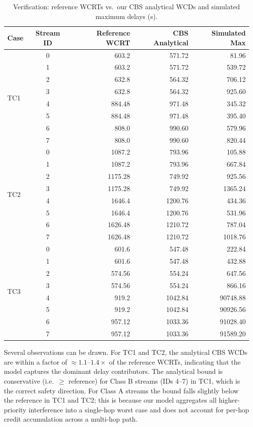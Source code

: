 \begin{table}[H]
\centering
\caption{Verification: reference WCRTs vs.\ our CBS analytical WCDs and simulated maximum delays (\textmu s).}
\label{tab:verification}
\begin{tabular}{lcrrr}
\toprule
Case & Stream ID & Reference WCRT & CBS Analytical & Simulated Max \\
\midrule
\multirow{8}{*}{TC1}
 & 0 & 603.2  & 571.72  & 81.96   \\
 & 1 & 603.2  & 571.72  & 539.72  \\
 & 2 & 632.8  & 564.32  & 706.12  \\
 & 3 & 632.8  & 564.32  & 925.60  \\
 & 4 & 884.48 & 971.48  & 345.32  \\
 & 5 & 884.48 & 971.48  & 395.40  \\
 & 6 & 808.0  & 990.60  & 579.96  \\
 & 7 & 808.0  & 990.60  & 820.44  \\
\midrule
\multirow{8}{*}{TC2}
 & 0 & 1087.2  & 793.96   & 105.88   \\
 & 1 & 1087.2  & 793.96   & 667.84   \\
 & 2 & 1175.28 & 749.92   & 925.56   \\
 & 3 & 1175.28 & 749.92   & 1365.24  \\
 & 4 & 1646.4  & 1200.76  & 434.36   \\
 & 5 & 1646.4  & 1200.76  & 531.96   \\
 & 6 & 1626.48 & 1210.72  & 787.04   \\
 & 7 & 1626.48 & 1210.72  & 1018.76  \\
\midrule
\multirow{8}{*}{TC3}
 & 0 & 601.6  & 547.48   & 222.84    \\
 & 1 & 601.6  & 547.48   & 432.88    \\
 & 2 & 574.56 & 554.24   & 647.56    \\
 & 3 & 574.56 & 554.24   & 866.16    \\
 & 4 & 919.2  & 1042.84  & 90748.88  \\
 & 5 & 919.2  & 1042.84  & 90926.56  \\
 & 6 & 957.12 & 1033.36  & 91028.40  \\
 & 7 & 957.12 & 1033.36  & 91589.20  \\
\bottomrule
\end{tabular}
\end{table}

Several observations can be drawn. For TC1 and TC2, the analytical CBS WCDs are within a factor of ${\approx}1.1$--$1.4\times$ of the reference WCRTs, indicating that the model captures the dominant delay contributors. The analytical bound is conservative (i.e.\ $\geq$ reference) for Class B streams (IDs 4--7) in TC1, which is the correct safety direction. For Class A streams the bound falls slightly below the reference in TC1 and TC2; this is because our model aggregates all higher-priority interference into a single-hop worst case and does not account for per-hop credit accumulation across a multi-hop path.

